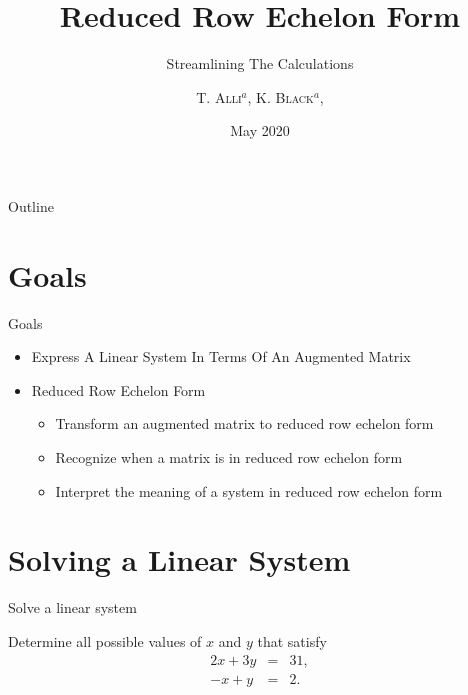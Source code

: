 \documentclass[svgnames,table,aspectratio=169]{beamer}
\begin{document}
\author{\textsc{T. Alli$^{a}$, K. Black$^{a}$,}}
\subject{Linear Algebra}


\title{Reduced Row Echelon Form}
\subtitle{Streamlining The Calculations}

\date{May 2020} %

\begin{frame}
  \titlepage
\end{frame}

\begin{frame}{Outline}
  \tableofcontents
\end{frame}


\section{Goals}

\begin{frame}{Goals}

  \begin{itemize}
  \item Express A Linear System In Terms Of An Augmented Matrix
  \item Reduced Row Echelon Form
    \begin{itemize}
    \item Transform an augmented matrix to reduced row echelon form
    \item Recognize when a matrix is in reduced row echelon form
    \item Interpret the meaning of a system in reduced row echelon form
    \end{itemize}
  \end{itemize}

\end{frame}

\section{Solving a Linear System}

\begin{frame}{Solve a linear system}

  Determine all possible values of $x$ and $y$ that satisfy
  \begin{eqnarray*}
    2x + 3y & = & 31, \\
    -x+y & = & 2.
  \end{eqnarray*}


\end{frame}
\end{document}
